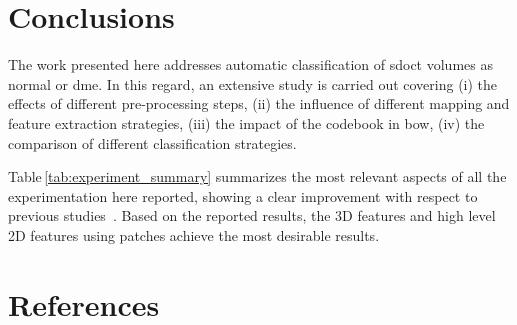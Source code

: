 \documentclass[review]{elsarticle}
\begin{document}
\maketitle

\linenumbers
\acresetall  %



%

\section{Conclusions}\label{sec:con}
The work presented here addresses automatic classification of \ac{sdoct} volumes as normal or \ac{dme}.
In this regard, an extensive study is carried out covering
(i) the effects of different pre-processing steps, 
(ii) the influence of different mapping and feature extraction strategies,
(iii) the impact of the codebook in \ac{bow},
(iv) the comparison of different classification strategies.

Table\,\ref{tab:experiment_summary} summarizes the most relevant aspects of all the experimentation here reported, 
showing a clear improvement with respect to previous studies~\cite{Lemaintre2015miccaiOCT,Venhuizen2015}.
Based on the reported results, the 3D features and high level 2D features using patches achieve the most desirable results.





\section*{References}
\end{document}

